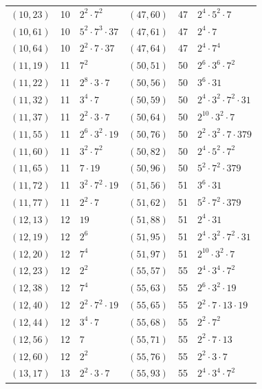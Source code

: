 \documentclass[11pt]{article}
\begin{document}
\begin{longtable}{@{}lrl@{\qquad}lrl@{}}
$(10,23)$ & 10 & $2^{2}\cdot 7^{2}$ & $(47,60)$ & 47 & $2^{4}\cdot 5^{2}\cdot 7$\\
$(10,61)$ & 10 & $5^{2}\cdot 7^{3}\cdot 37$ & $(47,61)$ & 47 & $2^{4}\cdot 7$\\
$(10,64)$ & 10 & $2^{2}\cdot 7\cdot 37$ & $(47,64)$ & 47 & $2^{4}\cdot 7^{4}$\\
$(11,19)$ & 11 & $7^{2}$ & $(50,51)$ & 50 & $2^{6}\cdot 3^{6}\cdot 7^{2}$\\
$(11,22)$ & 11 & $2^{8}\cdot 3\cdot 7$ & $(50,56)$ & 50 & $3^{6}\cdot 31$\\
$(11,32)$ & 11 & $3^{4}\cdot 7$ & $(50,59)$ & 50 & $2^{4}\cdot 3^{2}\cdot 7^{2}\cdot 31$\\
$(11,37)$ & 11 & $2^{2}\cdot 3\cdot 7$ & $(50,64)$ & 50 & $2^{10}\cdot 3^{2}\cdot 7$\\
$(11,55)$ & 11 & $2^{6}\cdot 3^{2}\cdot 19$ & $(50,76)$ & 50 & $2^{2}\cdot 3^{2}\cdot 7\cdot 379$\\
$(11,60)$ & 11 & $3^{2}\cdot 7^{2}$ & $(50,82)$ & 50 & $2^{4}\cdot 5^{2}\cdot 7^{2}$\\
$(11,65)$ & 11 & $7\cdot 19$ & $(50,96)$ & 50 & $5^{2}\cdot 7^{2}\cdot 379$\\
$(11,72)$ & 11 & $3^{2}\cdot 7^{2}\cdot 19$ & $(51,56)$ & 51 & $3^{6}\cdot 31$\\
$(11,77)$ & 11 & $2^{2}\cdot 7$ & $(51,62)$ & 51 & $5^{2}\cdot 7^{2}\cdot 379$\\
$(12,13)$ & 12 & $19$ & $(51,88)$ & 51 & $2^{4}\cdot 31$\\
$(12,19)$ & 12 & $2^{6}$ & $(51,95)$ & 51 & $2^{4}\cdot 3^{2}\cdot 7^{2}\cdot 31$\\
$(12,20)$ & 12 & $7^{4}$ & $(51,97)$ & 51 & $2^{10}\cdot 3^{2}\cdot 7$\\
$(12,23)$ & 12 & $2^{2}$ & $(55,57)$ & 55 & $2^{4}\cdot 3^{4}\cdot 7^{2}$\\
$(12,38)$ & 12 & $7^{4}$ & $(55,63)$ & 55 & $2^{6}\cdot 3^{2}\cdot 19$\\
$(12,40)$ & 12 & $2^{2}\cdot 7^{2}\cdot 19$ & $(55,65)$ & 55 & $2^{2}\cdot 7\cdot 13\cdot 19$\\
$(12,44)$ & 12 & $3^{4}\cdot 7$ & $(55,68)$ & 55 & $2^{2}\cdot 7^{2}$\\
$(12,56)$ & 12 & $7$ & $(55,71)$ & 55 & $2^{2}\cdot 7\cdot 13$\\
$(12,60)$ & 12 & $2^{2}$ & $(55,76)$ & 55 & $2^{2}\cdot 3\cdot 7$\\
$(13,17)$ & 13 & $2^{2}\cdot 3\cdot 7$ & $(55,93)$ & 55 & $2^{4}\cdot 3^{4}\cdot 7^{2}$\\

\end{longtable}
\end{document}
